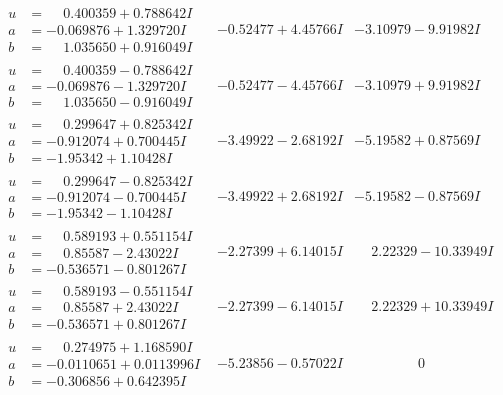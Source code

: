 \documentclass[1p]{elsarticle_modified}
\theoremstyle{definition}
\begin{document}
$$\begin{array}{c|c|c}
\begin{aligned}
u &= \phantom{-}0.400359 + 0.788642 I \\
a &= -0.069876 + 1.329720 I \\
b &= \phantom{-}1.035650 + 0.916049 I\end{aligned}
 & -0.52477 + 4.45766 I & -3.10979 - 9.91982 I \\ \hline\begin{aligned}
u &= \phantom{-}0.400359 - 0.788642 I \\
a &= -0.069876 - 1.329720 I \\
b &= \phantom{-}1.035650 - 0.916049 I\end{aligned}
 & -0.52477 - 4.45766 I & -3.10979 + 9.91982 I \\ \hline\begin{aligned}
u &= \phantom{-}0.299647 + 0.825342 I \\
a &= -0.912074 + 0.700445 I \\
b &= -1.95342 + 1.10428 I\end{aligned}
 & -3.49922 - 2.68192 I & -5.19582 + 0.87569 I \\ \hline\begin{aligned}
u &= \phantom{-}0.299647 - 0.825342 I \\
a &= -0.912074 - 0.700445 I \\
b &= -1.95342 - 1.10428 I\end{aligned}
 & -3.49922 + 2.68192 I & -5.19582 - 0.87569 I \\ \hline\begin{aligned}
u &= \phantom{-}0.589193 + 0.551154 I \\
a &= \phantom{-}0.85587 - 2.43022 I \\
b &= -0.536571 - 0.801267 I\end{aligned}
 & -2.27399 + 6.14015 I & \phantom{-}2.22329 - 10.33949 I \\ \hline\begin{aligned}
u &= \phantom{-}0.589193 - 0.551154 I \\
a &= \phantom{-}0.85587 + 2.43022 I \\
b &= -0.536571 + 0.801267 I\end{aligned}
 & -2.27399 - 6.14015 I & \phantom{-}2.22329 + 10.33949 I \\ \hline\begin{aligned}
u &= \phantom{-}0.274975 + 1.168590 I \\
a &= -0.0110651 + 0.0113996 I \\
b &= -0.306856 + 0.642395 I\end{aligned}
 & -5.23856 - 0.57022 I & \phantom{-0.000000 } 0 \\ \hline\begin{aligned}

\end{aligned}
\end{array}$$
\end{document}
